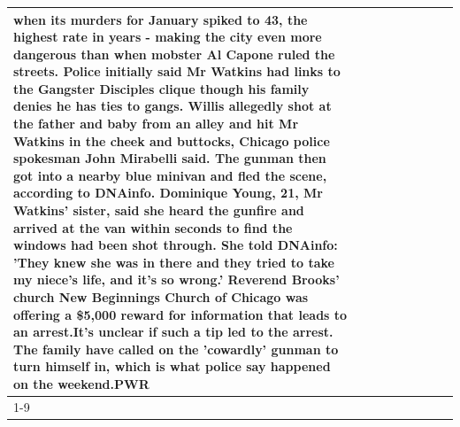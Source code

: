 \begin{table}[H]
\begin{tabular}{lllrlllll}
when its murders for January spiked to 43, the highest rate in years - making the city even more dangerous than when mobster Al Capone ruled the streets. Police initially said Mr Watkins had links to the Gangster Disciples clique though his family denies he has ties to gangs. Willis allegedly shot at the father and baby from an alley and hit Mr Watkins in the cheek and buttocks, Chicago police spokesman John Mirabelli said. The gunman then got into a nearby blue minivan and fled the scene, according to DNAinfo. Dominique Young, 21, Mr Watkins' sister, said she heard the gunfire and arrived at the van within seconds to find the windows had been shot through. She told DNAinfo: 'They knew she was in there and they tried to take my niece's life, and it's so wrong.' Reverend Brooks' church New Beginnings Church of Chicago was offering a \$5,000 reward for information that leads to an arrest.It's unclear if such a tip led to the arrest. The family have called on the 'cowardly' gunman to turn himself in, which is what police say happened on the weekend.PWR \\
\cline{1-9}

\end{tabular}
\end{table}
